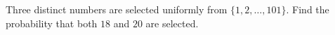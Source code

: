 Three distinct numbers are selected uniformly from $\{1,2,\ldots,101\}$. Find the probability that both $18$ and $20$ are selected.
